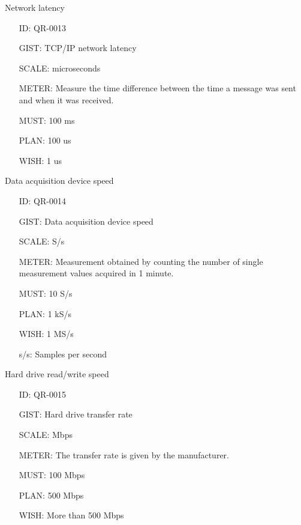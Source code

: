         Network latency

        \begin{itemize}
          \setlength{\itemindent}{.5in}
          \itemsep .15em
          \item[ID:] QR-0013
          \item[GIST:] TCP/IP network latency
          \item[SCALE:] microseconds
          \item[METER:] Measure the time difference between the time a message
            was sent and when it was received.
          \item[MUST:] 100 ms
          \item[PLAN:] 100 us
          \item[WISH:] 1 us
        \end{itemize}

        Data acquisition device speed

        \begin{itemize}
          \setlength{\itemindent}{.5in}
          \itemsep .15em
          \item[ID:] QR-0014
          \item[GIST:] Data acquisition device speed
          \item[SCALE:] S/s
          \item[METER:] Measurement obtained by counting the number of single
            measurement values acquired in 1 minute.
          \item[MUST:] 10 S/s
          \item[PLAN:] 1 kS/s
          \item[WISH:] 1 MS/s
          \item[s/s:] Samples per second
        \end{itemize}

        Hard drive read/write speed

        \begin{itemize}
          \setlength{\itemindent}{.5in}
          \itemsep .15em
          \item[ID:] QR-0015
          \item[GIST:] Hard drive transfer rate
          \item[SCALE:] Mbps
          \item[METER:] The transfer rate is given by the manufacturer.
          \item[MUST:] 100 Mbps
          \item[PLAN:] 500 Mbps
          \item[WISH:] More than 500 Mbps
        \end{itemize}

